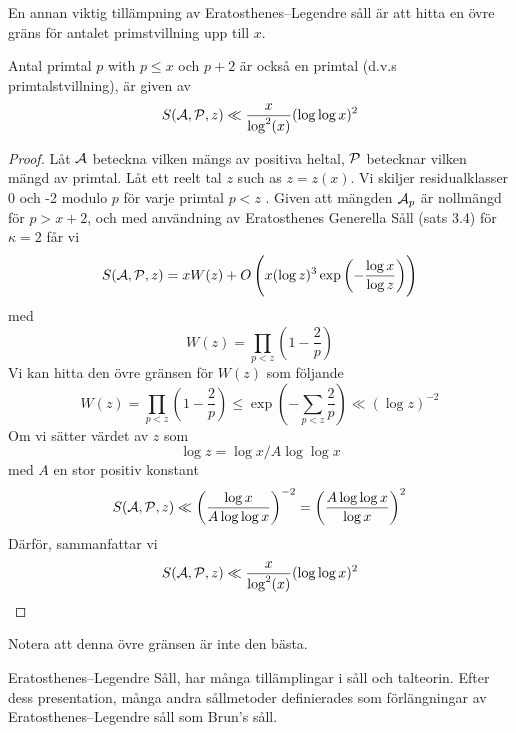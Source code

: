 En annan viktig tillämpning av Eratosthenes–Legendre såll är att hitta en övre gräns för antalet primstvillning upp till $ x $.
\begin{theorem}\hfill

Antal primtal $ p $ with $ p\leq x $ och $ p+2 $ är också en primtal (d.v.s primtalstvillning), är given av
\[\S\A\P z \ll\frac{x}{\log^{2}(x)}(\log\log x)^{2}\]
\end{theorem}
\begin{proof}
Låt $ \A $ beteckna vilken mängs av positiva heltal, $ \P $ betecknar vilken mängd av primtal. Låt ett reelt tal $ z $ such as $ z=z(x) $. Vi skiljer residualklasser 0 och -2 modulo $ p $ för varje primtal $ p<z $ . Given att mängden $ \A_p $ är nollmängd för $ p>x+2 $, och med användning av Eratosthenes Generella Såll (sats 3.4) för $ \kappa=2 $ får vi
\[\S\A\P z = xW(z)+O \left( x(\log z)^{3} \exp \left( -\frac{\log x}{\log z}\right) \right)\]
med
\[W(z)=\prod_{p<z}\left( 1-\frac{2}{p}\right)\]
Vi kan hitta den övre gränsen för $ W(z) $ som följande
\[W(z)=\prod_{p<z}\left( 1-\frac{2}{p}\right)\leq\exp \left( -\sum_{p<z}\frac{2}{p} \right)\ll (\log z)^{-2}\]
Om vi sätter värdet av $ z $ som
\[\log z = \log x/A\log\log x\] med $ A $ en stor positiv konstant
\[\S\A\P z \ll \left( \frac{\log x}{A\log\log x} \right)^{-2}=\left( \frac{A\log\log x}{\log x} \right)^{2}\]
Därför, sammanfattar vi
\[\S\A\P z \ll\frac{x}{\log^{2}(x)}(\log\log x)^{2}\]
\end{proof}
Notera att denna övre gränsen är inte den bästa. 
 


Eratosthenes–Legendre Såll, har många tillämplingar i såll och talteorin. Efter dess presentation, många andra sållmetoder definierades som förlängningar av Eratosthenes–Legendre såll som Brun's såll.









